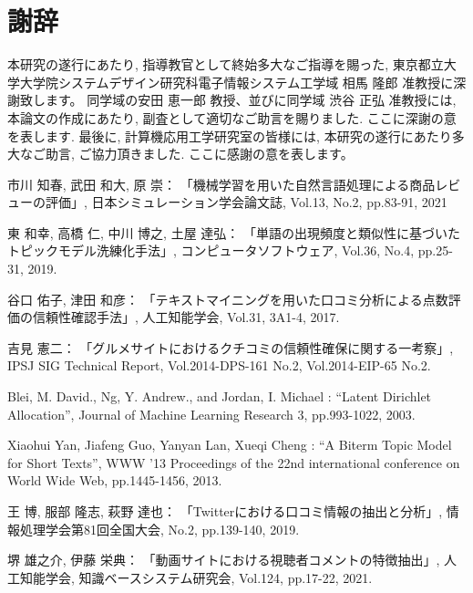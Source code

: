 \documentclass{ltjarticle}
\begin{document}
\newpage
\part*{謝辞}
本研究の遂行にあたり, 指導教官として終始多大なご指導を賜った, 
東京都立大学大学院システムデザイン研究科電子情報システム工学域 相馬 隆郎 准教授に深謝致します。
同学域の安田 恵一郎 教授、並びに同学域 渋谷 正弘 准教授には, 本論文の作成にあたり, 副査として適切なご助言を賜りました. ここに深謝の意を表します. 
最後に, 計算機応用工学研究室の皆様には, 本研究の遂行にあたり多大なご助言, ご協力頂きました. ここに感謝の意を表します。

\newpage
\begin{thebibliography}{99}
    市川 知春, 武田 和大, 原 崇：
    \newblock 「機械学習を用いた自然言語処理による商品レビューの評価」, 
    \newblock 日本シミュレーション学会論文誌, Vol.13, No.2, pp.83-91, 2021

    東 和幸, 高橋 仁, 中川 博之, 土屋 達弘：
    \newblock 「単語の出現頻度と類似性に基づいたトピックモデル洗練化手法」, 
    \newblock コンピュータソフトウェア, Vol.36, No.4, pp.25-31, 2019.

    谷口 佑子, 津田 和彦：
    \newblock 「テキストマイニングを用いた口コミ分析による点数評価の信頼性確認手法」, 
    \newblock 人工知能学会, Vol.31, 3A1-4, 2017.

    吉見 憲二：
    \newblock 「グルメサイトにおけるクチコミの信頼性確保に関する一考察」, 
    \newblock IPSJ SIG Technical Report, Vol.2014-DPS-161 No.2, Vol.2014-EIP-65 No.2.   

    Blei, M. David., Ng, Y. Andrew., and Jordan, I. Michael : 
    \newblock ``Latent Dirichlet Allocation'', 
    \newblock Journal of Machine Learning Research 3, pp.993-1022, 2003.

    Xiaohui Yan, Jiafeng Guo, Yanyan Lan, Xueqi Cheng :
    \newblock ``A Biterm Topic Model for Short Texts'', 
    \newblock WWW '13 Proceedings of the 22nd international conference on World Wide Web, pp.1445-1456, 2013.

    王 博, 服部 隆志, 萩野 達也：
    \newblock 「Twitterにおける口コミ情報の抽出と分析」,
    \newblock 情報処理学会第81回全国大会, No.2, pp.139-140, 2019.

    堺 雄之介, 伊藤 栄典：
    \newblock 「動画サイトにおける視聴者コメントの特徴抽出」,
    \newblock 人工知能学会, 知識ベースシステム研究会, Vol.124, pp.17-22, 2021.


\end{thebibliography}
\end{document}
